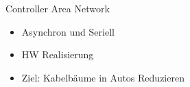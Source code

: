 \documentclass[letterpaper,10pt,english]{jupyterBook}
\begin{document}
\begin{DUlineblock}{0em}
\item[] 
\end{DUlineblock}

\begin{DUlineblock}{0em}
\item[] 
\end{DUlineblock}

\sphinxAtStartPar
Controller Area Network

\sphinxAtStartPar
{}
\begin{itemize}
\item {} 
\sphinxAtStartPar
Asynchron und Seriell

\item {} 
\sphinxAtStartPar
HW Realisierung

\item {} 
\sphinxAtStartPar
Ziel: Kabelbäume in Autos Reduzieren

\end{itemize}
\end{document}
